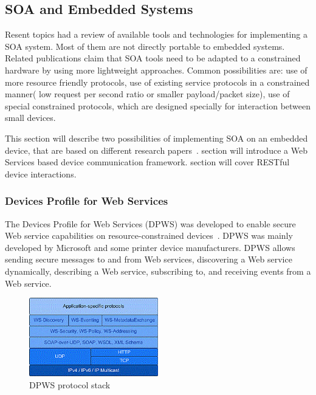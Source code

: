 \subsection{SOA and Embedded Systems}

Resent topics had a review of available tools and technologies for implementing a
SOA system. Most of them are not directly portable to embedded systems.
Related publications \cite{5470528, dguinard-rest-vs-ws} claim that SOA
tools need to be adapted to a constrained hardware by using more lightweight approaches.
Common possibilities are: use of more resource friendly protocols, use of
existing service protocols in a constrained manner( low request per second
ratio or smaller payload/packet size), use of special constrained protocols,
which are designed specially for interaction between small devices.

This section will describe two possibilities of implementing SOA on an embedded
device, that are based on different research
papers~\cite{coap_survey,4221180}.
 section will introduce a
Web Services based device communication framework.  section
will cover RESTful device interactions.
\subsubsection{Devices Profile for Web Services}
\label{sec:DPWS}
The Devices Profile for Web Services (DPWS) was developed to enable secure Web
service capabilities on resource-constrained devices~\cite{ws4d_dpws}.
DPWS was mainly developed by Microsoft and some printer device manufacturers.
DPWS allows sending secure messages to and from Web services, discovering a Web service dynamically, describing a Web service, subscribing to, and receiving events from a Web service.


\begin{center}
 \begin{figure}[h]
	\centering
	\includegraphics[width=0.5\textwidth]{../images/background/dpws-stack.png}
	\caption{DPWS protocol stack \cite{ws4d_dpws} }
	\label{fig:dpws_protocol_stack}
 \end{figure}
\end{center}


